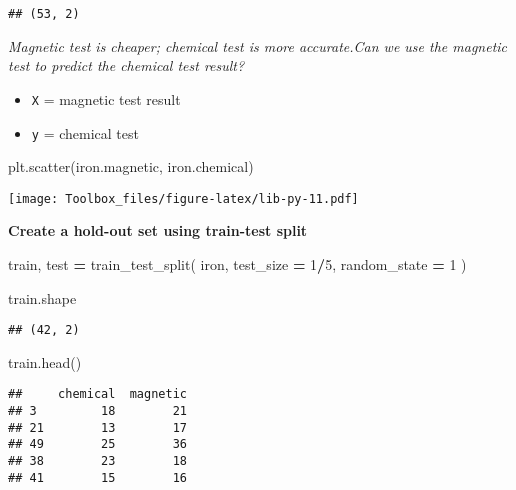 \documentclass[
]{book}
\newenvironment{Shaded}{\begin{snugshade}}{\end{snugshade}}
\newcommand{\DecValTok}[1]{\textcolor[rgb]{0.00,0.00,0.81}{#1}}
\newcommand{\NormalTok}[1]{#1}
\newcommand{\OperatorTok}[1]{\textcolor[rgb]{0.81,0.36,0.00}{\textbf{#1}}}
\begin{document}
\begin{verbatim}
## (53, 2)
\end{verbatim}

\emph{Magnetic test is cheaper; chemical test is more accurate.Can we use the magnetic test to predict the chemical test result?}

\begin{itemize}
\item
  \texttt{X} = magnetic test result
\item
  \texttt{y} = chemical test
\end{itemize}

\begin{Shaded}
\begin{Highlighting}[]
\NormalTok{plt.scatter(iron.magnetic, iron.chemical)}
\end{Highlighting}
\end{Shaded}

\texttt{[image: Toolbox\_files/figure-latex/lib-py-11.pdf]}

\textbf{Create a hold-out set using train-test split}

\begin{Shaded}
\begin{Highlighting}[]
\NormalTok{train, test }\OperatorTok{=}\NormalTok{ train\_test\_split(}
\NormalTok{  iron, test\_size }\OperatorTok{=} \DecValTok{1}\OperatorTok{/}\DecValTok{5}\NormalTok{, random\_state }\OperatorTok{=} \DecValTok{1}
\NormalTok{)}
\end{Highlighting}
\end{Shaded}

\begin{Shaded}
\begin{Highlighting}[]
\NormalTok{train.shape}
\end{Highlighting}
\end{Shaded}

\begin{verbatim}
## (42, 2)
\end{verbatim}

\begin{Shaded}
\begin{Highlighting}[]
\NormalTok{train.head()}
\end{Highlighting}
\end{Shaded}

\begin{verbatim}
##     chemical  magnetic
## 3         18        21
## 21        13        17
## 49        25        36
## 38        23        18
## 41        15        16
\end{verbatim}
\end{document}

